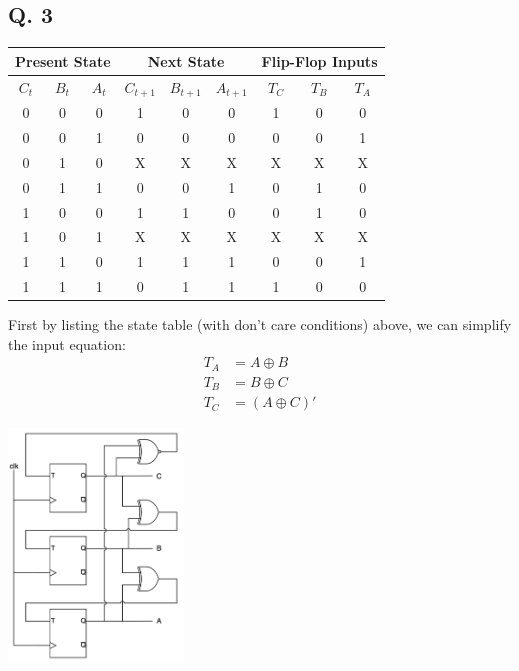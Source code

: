 \documentclass[onecolumn, oneside, ctexart]{SUSTechHomework}
\begin{document}
\subsection*{Q. 3}
\vspace{-2em}
\begin{longtable}[c]{ccc|ccc|ccc}
\hline
\multicolumn{3}{c|}{Present State} & \multicolumn{3}{c|}{Next State}   & \multicolumn{3}{c}{Flip-Flop Inputs} \\ \hline
\endfirsthead
%
\endhead
%
\hline
\endfoot
%
\endlastfoot
%
$C_{t}$    & $B_{t}$   & $A_{t}$   & $C_{t+1}$ & $B_{t+1}$ & $A_{t+1}$ & $T_C$      & $T_B$      & $T_A$      \\ \hline
0          & 0         & 0         & 1         & 0         & 0         & 1          & 0          & 0          \\
0          & 0         & 1         & 0         & 0         & 0         & 0          & 0          & 1          \\
0          & 1         & 0         & X         & X         & X         & X          & X          & X          \\
0          & 1         & 1         & 0         & 0         & 1         & 0          & 1          & 0          \\
1          & 0         & 0         & 1         & 1         & 0         & 0          & 1          & 0          \\
1          & 0         & 1         & X         & X         & X         & X          & X          & X          \\
1          & 1         & 0         & 1         & 1         & 1         & 0          & 0          & 1          \\
1          & 1         & 1         & 0         & 1         & 1         & 1          & 0          & 0          \\ \hline
\end{longtable}
\vspace{-1em}
\par First by listing the state table (with don't care conditions) above, we can simplify the input equation:
\begin{align*}
T_A&=A\oplus B\\
T_B&=B\oplus C\\
T_C&=(A\oplus C)'
\end{align*}
\centerline{\includegraphics[width=0.35\textwidth]{fig/q31}}
\end{document}
